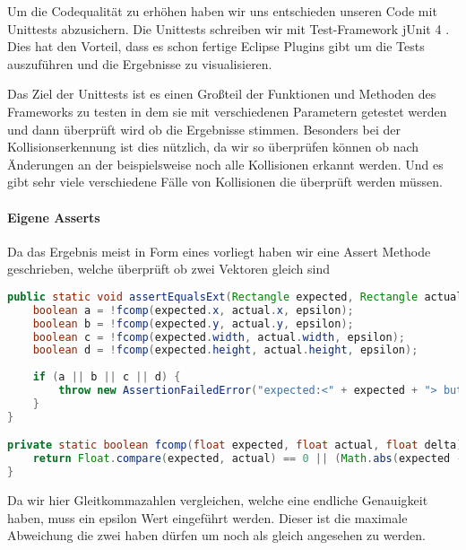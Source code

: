 
Um die Codequalität zu erhöhen haben wir uns entschieden unseren Code mit Unittests abzusichern.
Die Unittests schreiben wir mit Test-Framework jUnit 4 \cite{JUNIT}. Dies hat den Vorteil, dass es schon fertige Eclipse Plugins gibt um die Tests auszuführen und die Ergebnisse zu visualisieren.


Das Ziel der Unittests ist es einen Großteil der Funktionen und Methoden des Frameworks zu testen in dem sie mit verschiedenen Parametern getestet werden und dann überprüft wird ob die Ergebnisse stimmen.
Besonders bei der Kollisionserkennung ist dies nützlich, da wir so überprüfen können ob nach Änderungen an der  beispielsweise noch alle Kollisionen erkannt werden. Und es gibt sehr viele verschiedene Fälle von Kollisionen die überprüft werden müssen.

\paragraph{Eigene Asserts}

Da das Ergebnis meist in Form eines  vorliegt haben wir eine Assert Methode geschrieben, welche überprüft ob zwei Vektoren gleich sind

\doinline
\begin{lstlisting}[caption=Eine Assert Methode für zwe Vektoren, title=\hspace{0 pt}, language=java]
public static void assertEqualsExt(Rectangle expected, Rectangle actual, float epsilon) {
	boolean a = !fcomp(expected.x, actual.x, epsilon);
	boolean b = !fcomp(expected.y, actual.y, epsilon);
	boolean c = !fcomp(expected.width, actual.width, epsilon);
	boolean d = !fcomp(expected.height, actual.height, epsilon);
	
	if (a || b || c || d) {
		throw new AssertionFailedError("expected:<" + expected + "> but was:<" + actual + ">" );
	}
}

private static boolean fcomp(float expected, float actual, float delta) {
	return Float.compare(expected, actual) == 0 || (Math.abs(expected - actual) <= delta);
}
\end{lstlisting}

Da wir hier Gleitkommazahlen vergleichen, welche eine endliche Genauigkeit haben, muss ein epsilon Wert eingeführt werden. Dieser ist die maximale Abweichung die zwei  haben dürfen um noch als gleich angesehen zu werden.

